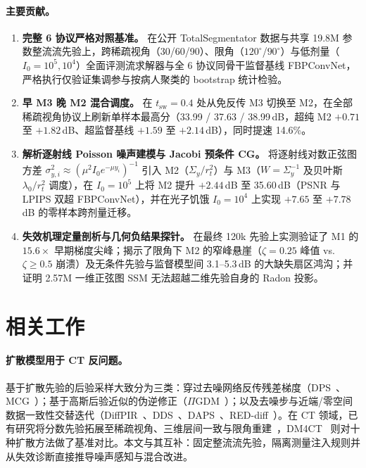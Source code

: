 \documentclass[11pt,UTF8]{ctexart}
\begin{document}
\paragraph{主要贡献。}
\begin{enumerate}[leftmargin=*,nosep]
  \item \textbf{完整 6 协议严格对照基准。} 在公开 TotalSegmentator 数据与共享 19.8M 参数整流流先验上，跨稀疏视角（30/60/90）、限角（$120^\circ$/$90^\circ$）与低剂量（$I_0{=}10^5, 10^4$）全面评测流求解器与全 6 协议同骨干监督基线 FBPConvNet，严格执行仅验证集调参与按病人聚类的 bootstrap 统计检验。
  \item \textbf{早 M3 晚 M2 混合调度。} 在 $t_{\mathrm{sw}}{=}0.4$ 处从免反传 M3 切换至 M2，在全部稀疏视角协议上刷新单样本最高分（33.99 / 37.63 / 38.99\,dB，超纯 M2 $+0.71$ 至 $+1.82$\,dB、超监督基线 $+1.59$ 至 $+2.14$\,dB），同时提速 14.6\%。
  \item \textbf{解析逐射线 Poisson 噪声建模与 Jacobi 预条件 CG。} 将逐射线对数正弦图方差 $\sigma_{y,i}^2\approx(\mu^2 I_0 e^{-\mu y_i})^{-1}$ 引入 M2（$\Sigma_y/r_t^2$）与 M3（$W{=}\Sigma_y^{-1}$ 及贝叶斯 $\lambda_0/r_t^2$ 调度），在 $I_0{=}10^5$ 上将 M2 提升 $+2.44$\,dB 至 35.60\,dB（PSNR 与 LPIPS 双超 FBPConvNet），并在光子饥饿 $I_0{=}10^4$ 上实现 $+7.65$ 至 $+7.78$\,dB 的零样本跨剂量迁移。
  \item \textbf{失效机理定量剖析与几何负结果探针。} 在最终 120k 先验上实测验证了 M1 的 $15.6\times$ 早期梯度尖峰；揭示了限角下 M2 的窄峰悬崖（$\zeta{=}0.25$ 峰值 vs.\ $\zeta{\ge}0.5$ 崩溃）及无条件先验与监督模型间 3.1--5.3\,dB 的大缺失扇区鸿沟；并证明 2.57M 一维正弦图 SSM 无法超越二维先验自身的 Radon 投影。
\end{enumerate}

\section{相关工作}
\paragraph{扩散模型用于 CT 反问题。}
基于扩散先验的后验采样大致分为三类：穿过去噪网络反传残差梯度（DPS~\cite{chung2023dps}、MCG~\cite{chung2022mcg}）；基于高斯后验近似的伪逆修正（$\Pi$GDM~\cite{song2023pigdm}）；以及去噪步与近端/零空间数据一致性交替迭代（DiffPIR~\cite{zhu2023diffpir}、DDS~\cite{chung2024dds}、DAPS~\cite{zhang2025daps}、RED-diff~\cite{mardani2024reddiff}）。在 CT 领域，已有研究将分数先验拓展至稀疏视角、三维层间一致与限角重建~\cite{song2022scoremed,chung2023diffusionmbir,song2024diffusionblend,liu2023dolce}，DM4CT~\cite{shi2026dm4ct} 则对十种扩散方法做了基准对比。本文与其互补：固定整流流先验，隔离测量注入规则并从失效诊断直接推导噪声感知与混合改进。
\end{document}
